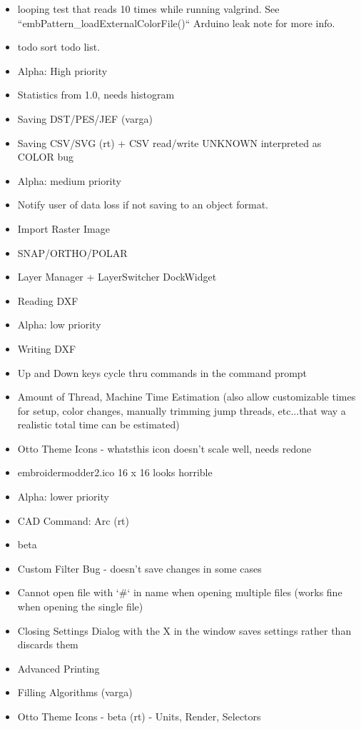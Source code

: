 \documentclass[a4paper]{report}
\begin{document}
\begin{itemize}
\item looping test that reads 10 times while running valgrind. See ``embPattern\_loadExternalColorFile()`` Arduino leak note for more info.

\item todo sort todo list.
\item Alpha: High priority
  \item Statistics from 1.0, needs histogram
  \item Saving DST/PES/JEF (varga)
  \item Saving CSV/SVG (rt) + CSV read/write UNKNOWN interpreted as COLOR bug
\item Alpha: medium priority
  \item Notify user of data loss if not saving to an object format.
  \item Import Raster Image
  \item SNAP/ORTHO/POLAR
  \item Layer Manager + LayerSwitcher DockWidget
  \item Reading DXF
\item Alpha: low priority
  \item Writing DXF\item Up and Down keys cycle thru commands in the command prompt
  \item Amount of Thread, Machine Time Estimation (also allow customizable times for setup, color changes, manually trimming jump threads, etc...that way a realistic total time can be estimated)
  \item Otto Theme Icons - whatsthis icon doesn't scale well, needs redone
  \item embroidermodder2.ico 16 x 16 looks horrible
\item Alpha: lower priority
  \item CAD Command: Arc (rt)
\item beta
  \item Custom Filter Bug - doesn't save changes in some cases
  \item Cannot open file with `\#` in name when opening multiple files (works fine when opening the single file)
  \item Closing Settings Dialog with the X in the window saves settings rather than discards them
  \item Advanced Printing
  \item Filling Algorithms (varga)
  \item Otto Theme Icons - beta (rt) - Units, Render, Selectors

\end{itemize}
\end{document}
